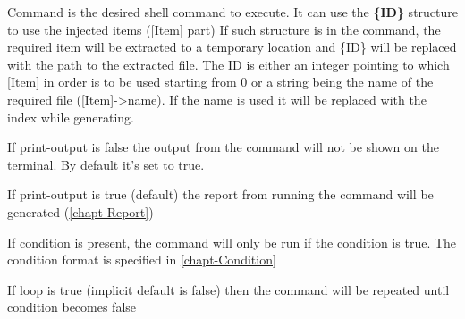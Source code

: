 Command is the desired shell command to execute. It can use the  \textbf{\{ID\}} structure to use the injected items ([Item] part)
If such structure is in the command, the required item will be extracted to a temporary location and \{ID\} will be replaced with the path to the extracted file. The ID is either an integer pointing to which [Item] in order is to be used starting from 0 or a string being the name of the required file ([Item]->name). If the name is used it will be replaced with the index while generating.

If print-output is false the output from the command will not be shown on the terminal. By default it's set to true.

If print-output is true (default) the report from running the command will be generated (\autoref{chapt-Report})

If condition is present, the command will only be run if the condition is true. The condition format is specified in \autoref{chapt-Condition}

If loop is true (implicit default is false) then the command will be repeated until condition becomes false